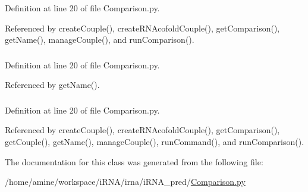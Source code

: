 \-Definition at line 20 of file \-Comparison.\-py.



\-Referenced by create\-Couple(), create\-R\-N\-Acofold\-Couple(), get\-Comparison(), get\-Name(), manage\-Couple(), and run\-Comparison().

\hypertarget{classirna_1_1iRNA__pred_1_1Comparison_1_1Comparaison_a2b9fed45d7501c91a4620a86245d8b4c}{
\subsubsection[{soft\-\_\-path}]{}}
\label{classirna_1_1iRNA__pred_1_1Comparison_1_1Comparaison_a2b9fed45d7501c91a4620a86245d8b4c}


\-Definition at line 20 of file \-Comparison.\-py.



\-Referenced by get\-Name().

\hypertarget{classirna_1_1iRNA__pred_1_1Comparison_1_1Comparaison_aa9ccc135750bf4ec990e98f521b2c7e5}{
\subsubsection[{s\-R\-N\-A\-\_\-out}]{}}
\label{classirna_1_1iRNA__pred_1_1Comparison_1_1Comparaison_aa9ccc135750bf4ec990e98f521b2c7e5}


\-Definition at line 20 of file \-Comparison.\-py.



\-Referenced by create\-Couple(), create\-R\-N\-Acofold\-Couple(), get\-Comparison(), get\-Couple(), get\-Name(), manage\-Couple(), run\-Command(), and run\-Comparison().



\-The documentation for this class was generated from the following file\-:\begin{DoxyCompactItemize}
\item 
/home/amine/workspace/i\-R\-N\-A/irna/i\-R\-N\-A\-\_\-pred/\hyperlink{Comparison_8py}{\-Comparison.\-py}\end{DoxyCompactItemize}
